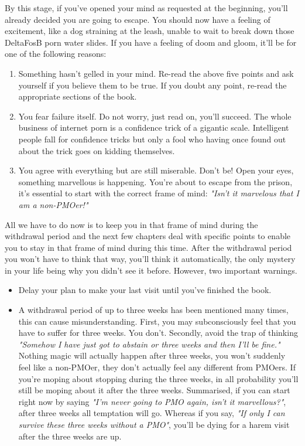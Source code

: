 \documentclass[easypeasy]{subfiles}
\begin{document}
By this stage, if you've opened your mind as requested at the beginning, you'll already decided you are going to escape. You should now have a feeling of excitement, like a dog straining at the leash, unable to wait to break down those DeltaFosB porn water slides. If you have a feeling of doom and gloom, it'll be for one of the following reasons:
\begin{enumerate}
  \item Something hasn't gelled in your mind. Re-read the above five points and ask yourself if you believe them to be true. If you doubt any point, re-read the appropriate sections of the book.

  \item You fear failure itself. Do not worry, just read on, you'll succeed. The whole business of internet porn is a confidence trick of a gigantic scale. Intelligent people fall for confidence tricks but only a fool who having once found out about the trick goes on kidding themselves.

  \item You agree with everything but are still miserable. Don't be! Open your eyes, something marvellous is happening. You're about to escape from the prison, it's essential to start with the correct frame of mind: \textit{"Isn't it marvelous that I am a non-PMOer!"}
  \end{enumerate}
All we have to do now is to keep you in that frame of mind during the withdrawal period and the next few chapters deal with specific points to enable you to stay in that frame of mind during this time. After the withdrawal period you won't have to think that way, you'll think it automatically, the only mystery in your life being why you didn't see it before. However, two important warnings.

  \begin{itemize}
  \item Delay your plan to make your last visit until you've finished the book.
  \item A withdrawal period of up to three weeks has been mentioned many times, this can cause misunderstanding. First, you may subconsciously feel that you have to suffer for three weeks. You don't. Secondly, avoid the trap of thinking \textit{"Somehow I have just got to abstain or three weeks and then I'll be fine."} Nothing magic will actually happen after three weeks, you won't suddenly feel like a non-PMOer, they don't actually feel any different from PMOers. If you're moping about stopping during the three weeks, in all probability you'll still be moping about it after the three weeks. Summarised, if you can start right now by saying \textit{"I'm never going to PMO again, isn't it marvellous?"}, after three weeks all temptation will go. Whereas if you say, \textit{"If only I can survive these three weeks without a PMO"}, you'll be dying for a harem visit after the three weeks are up.
  \end{itemize}
\end{document}
